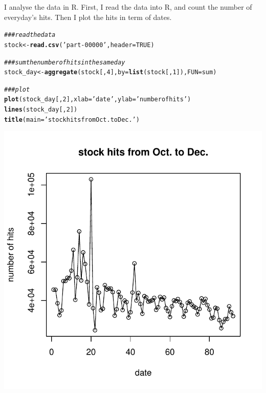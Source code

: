 \documentclass{article}\usepackage[]{graphicx}\usepackage[]{color}
\makeatletter
\def\maxwidth{ %
  \ifdim\Gin@nat@width>\linewidth
    \linewidth
  \else
    \Gin@nat@width
  \fi
}
\newcommand{\hlnum}[1]{\textcolor[rgb]{0.686,0.059,0.569}{#1}}%
\newcommand{\hlstr}[1]{\textcolor[rgb]{0.192,0.494,0.8}{#1}}%
\newcommand{\hlcom}[1]{\textcolor[rgb]{0.678,0.584,0.686}{\textit{#1}}}%
\newcommand{\hlstd}[1]{\textcolor[rgb]{0.345,0.345,0.345}{#1}}%
\newcommand{\hlkwb}[1]{\textcolor[rgb]{0.69,0.353,0.396}{#1}}%
\newcommand{\hlkwc}[1]{\textcolor[rgb]{0.333,0.667,0.333}{#1}}%
\newcommand{\hlkwd}[1]{\textcolor[rgb]{0.737,0.353,0.396}{\textbf{#1}}}%
\newenvironment{kframe}{%
 \def\at@end@of@kframe{}%
 \ifinner\ifhmode%
  \def\at@end@of@kframe{\end{minipage}}%
  \begin{minipage}{\columnwidth}%
 \fi\fi%
 \def\FrameCommand##1{\hskip\@totalleftmargin \hskip-\fboxsep
 \colorbox{shadecolor}{##1}\hskip-\fboxsep
     \hskip-\linewidth \hskip-\@totalleftmargin \hskip\columnwidth}%
 \MakeFramed {\advance\hsize-\width
   \@totalleftmargin\z@ \linewidth\hsize
   \@setminipage}}%
 {\par\unskip\endMakeFramed%
 \at@end@of@kframe}
\newenvironment{knitrout}{}{} %
\makeatother
\begin{document}
I analyse the data in R. First, I read the data into R, and count the number of everyday's hits. Then I plot the hits in term of dates.
\begin{knitrout}
\color{fgcolor}\begin{kframe}
\begin{alltt}
\hlcom{###read the data}
\hlstd{stock}\hlkwb{<-}\hlkwd{read.csv}\hlstd{(}\hlstr{'part-00000'}\hlstd{,}\hlkwc{header}\hlstd{=}\hlnum{TRUE}\hlstd{)}

\hlcom{###sum the number of hits in the same day}
\hlstd{stock_day}\hlkwb{<-}\hlkwd{aggregate}\hlstd{(stock[,}\hlnum{4}\hlstd{],}\hlkwc{by}\hlstd{=}\hlkwd{list}\hlstd{(stock[,}\hlnum{1}\hlstd{]),}\hlkwc{FUN}\hlstd{=sum)}

\hlcom{###plot }
\hlkwd{plot}\hlstd{(stock_day[,}\hlnum{2}\hlstd{],}\hlkwc{xlab}\hlstd{=}\hlstr{'date'}\hlstd{,}\hlkwc{ylab}\hlstd{=}\hlstr{'number of hits'}\hlstd{)}
\hlkwd{lines}\hlstd{(stock_day[,}\hlnum{2}\hlstd{])}
\hlkwd{title}\hlstd{(}\hlkwc{main}\hlstd{=}\hlstr{'stock hits from Oct. to Dec.'}\hlstd{)}
\end{alltt}
\end{kframe}
\includegraphics[width=\maxwidth]{figure/r-chunk3-1} 

\end{knitrout}
\end{document}
